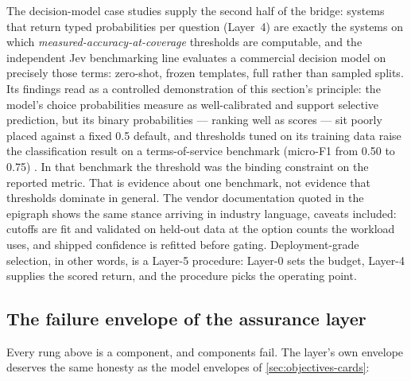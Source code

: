 The decision-model case studies supply the second half of the bridge: systems that return typed
probabilities per question (Layer~4) are exactly the systems on which
\emph{measured-accuracy-at-coverage} thresholds are computable, and the independent Jev
benchmarking line evaluates a commercial decision model on precisely those terms:
zero-shot, frozen templates, full rather than sampled splits. Its findings read as a
controlled demonstration of this section's principle: the model's choice probabilities
measure as well-calibrated and support selective prediction, but its binary
probabilities --- ranking well as scores --- sit poorly placed against a fixed 0.5 default,
and thresholds tuned on its training data raise the classification result on a
terms-of-service benchmark (micro-F1 from 0.50 to 0.75) \cite{rauk2026jevbenchmark}
\evindep{}. In that benchmark the threshold was the binding
constraint on the reported metric. That is evidence about one benchmark, not evidence that
thresholds dominate in general. The vendor documentation quoted in the epigraph shows
the same stance arriving in industry language, caveats included: cutoffs are fit and validated
on held-out data at the option counts the workload uses, and shipped confidence is refitted
before gating. Deployment-grade selection, in other words, is a Layer-5 procedure: Layer-0
sets the budget, Layer-4 supplies the scored return, and the procedure picks the operating point.

\subsection{The failure envelope of the assurance layer}
\label{sec:l5-envelope}

Every rung above is a component, and components fail. The layer's own envelope deserves the
same honesty as the model envelopes of \cref{sec:objectives-cards}:

